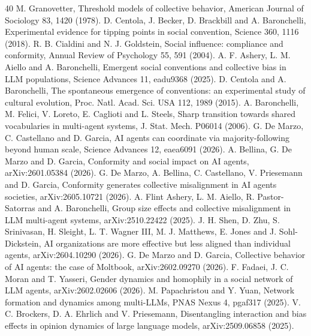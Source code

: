 \documentclass[twocolumn,10pt]{article}
\begin{document}
\begin{thebibliography}{40}
 M. Granovetter, Threshold models of collective behavior, American Journal of Sociology 83, 1420 (1978).
 D. Centola, J. Becker, D. Brackbill and A. Baronchelli, Experimental evidence for tipping points in social convention, Science 360, 1116 (2018).
 R. B. Cialdini and N. J. Goldstein, Social influence: compliance and conformity, Annual Review of Psychology 55, 591 (2004).
 A. F. Ashery, L. M. Aiello and A. Baronchelli, Emergent social conventions and collective bias in LLM populations, Science Advances 11, eadu9368 (2025).
 D. Centola and A. Baronchelli, The spontaneous emergence of conventions: an experimental study of cultural evolution, Proc. Natl. Acad. Sci. USA 112, 1989 (2015).
 A. Baronchelli, M. Felici, V. Loreto, E. Caglioti and L. Steels, Sharp transition towards shared vocabularies in multi-agent systems, J. Stat. Mech. P06014 (2006).
 G. De Marzo, C. Castellano and D. Garcia, AI agents can coordinate via majority-following beyond human scale, Science Advances 12, eaea6091 (2026).
 A. Bellina, G. De Marzo and D. Garcia, Conformity and social impact on AI agents, arXiv:2601.05384 (2026).
 G. De Marzo, A. Bellina, C. Castellano, V. Priesemann and D. Garcia, Conformity generates collective misalignment in AI agents societies, arXiv:2605.10721 (2026).
 A. Flint Ashery, L. M. Aiello, R. Pastor-Satorras and A. Baronchelli, Group size effects and collective misalignment in LLM multi-agent systems, arXiv:2510.22422 (2025).
 J. H. Shen, D. Zhu, S. Srinivasan, H. Sleight, L. T. Wagner III, M. J. Matthews, E. Jones and J. Sohl-Dickstein, AI organizations are more effective but less aligned than individual agents, arXiv:2604.10290 (2026).
 G. De Marzo and D. Garcia, Collective behavior of AI agents: the case of Moltbook, arXiv:2602.09270 (2026).
 F. Fadaei, J. C. Moran and T. Yasseri, Gender dynamics and homophily in a social network of LLM agents, arXiv:2602.02606 (2026).
 M. Papachristou and Y. Yuan, Network formation and dynamics among multi-LLMs, PNAS Nexus 4, pgaf317 (2025).
 V. C. Brockers, D. A. Ehrlich and V. Priesemann, Disentangling interaction and bias effects in opinion dynamics of large language models, arXiv:2509.06858 (2025).

\end{thebibliography}
\end{document}
